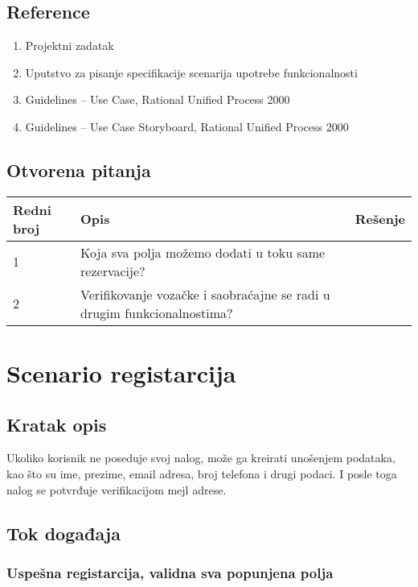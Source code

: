 \documentclass[12pt]{article}
\begin{document}
\subsection{Reference}
\begin{enumerate}
   \item Projektni zadatak
   \item Uputstvo za pisanje specifikacije scenarija upotrebe funkcionalnosti
   \item  Guidelines – Use Case, Rational Unified Process 2000
   \item  Guidelines – Use Case Storyboard, Rational Unified Process 2000
 \end{enumerate}
\subsection{Otvorena pitanja}


\begin{center}
\begin{tabular}{ | m{2cm} | m{7cm}| m{7cm} | } 
\hline
Redni broj& Opis & Rešenje \\ 
\hline
1 & Koja sva polja možemo dodati u toku same rezervacije? & \\
\hline
2 & Verifikovanje vozačke i saobraćajne se radi u drugim funkcionalnostima? & \\
\hline
\end{tabular}
\end{center}

    

\section{Scenario registarcija}
\subsection{Kratak opis}
Ukoliko korisnik ne poseduje svoj nalog, može ga kreirati unošenjem
podataka, kao što su ime, prezime, email adresa, broj telefona i drugi podaci. I posle toga nalog se potvrđuje verifikacijom mejl adrese.
\subsection{Tok događaja}

\subsubsection{Uspešna registarcija, validna sva popunjena polja}
\end{document}
